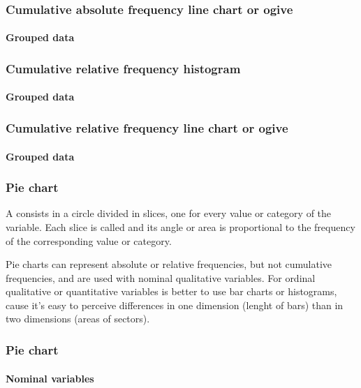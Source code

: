 \begin{frame}
\frametitle{Cumulative absolute frequency line chart or ogive}
\framesubtitle{Grouped data}
\begin{center}
\scalebox{0.6}{} 
\end{center} 
\end{frame}


\begin{frame}
\frametitle{Cumulative relative frequency histogram}
\framesubtitle{Grouped data}
\begin{center}
\scalebox{0.6}{}
\end{center} 
\end{frame}


\begin{frame}
\frametitle{Cumulative relative frequency line chart or ogive}
\framesubtitle{Grouped data}
\begin{center}
\scalebox{0.6}{} 
\end{center} 
\end{frame}
 

\begin{frame}
\frametitle{Pie chart}
A  consists in a circle divided in slices, one for every value or category of the variable. 
Each slice is called  and its angle or area is proportional to the frequency of the corresponding
value or category. 

Pie charts can represent absolute or relative frequencies, but not cumulative frequencies, and are used with nominal
qualitative variables.
For ordinal qualitative or quantitative variables is better to use bar charts or histograms, cause it's easy to perceive
differences in one dimension (lenght of bars) than in two dimensions (areas of sectors).
\end{frame}


\begin{frame}
\frametitle{Pie chart}
\framesubtitle{Nominal variables}
\begin{center}
\scalebox{0.6}{}
\end{center}
\end{frame}


